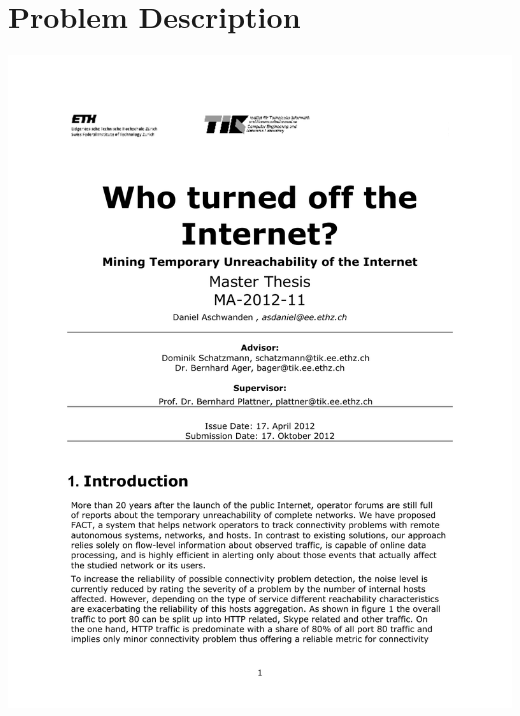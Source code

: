 \newpage
\section{Problem Description}

\includegraphics[width=\linewidth, page=1]{ThesisDescription.pdf}
\newpage
